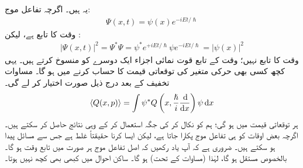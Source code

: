  \quad 
یہ  ہیں۔ اگرچہ تفاعل موج:
\begin{align}\label{مساوات_شروڈنگر_غیر_تابع_اور_تابع}
\Psi (x,t) = \psi (x) e^{-iEt/\hslash}
\end{align}
وقت  کا تابع ہے،  لیکن :
\begin{align}
\left| \Psi (x,t) \right|^{2} = \Psi^{*}\Psi = \psi^{*}e^{+iEt/\hslash} \psi e^{-iEt/\hslash} = \left| \psi (x) \right|^{2}
\end{align}
وقت کا تابع نہیں؛ وقت کے تابع قوت  نمائی اجزاء ایک دوسرے کو منسوخ کرتے ہیں۔ یہی کچھ کسی بھی حرکی متغیر کی توقعاتی قیمت کا  حساب کرنے میں ہو گا۔ مساوات  تخفیف کے بعد درج ذیل صورت اختیار کر لے گی۔ 
\begin{align}\label{مساوات_غیر_تابع_وقت_توقعاتی_قیمت}
\langle Q(x,p) \rangle = \int \psi^{*} Q \left( x, \frac{\hslash}{i} \frac{\dif}{\dif x} \right) \psi \dif x
\end{align}
ہر توقعاتی قیمت  میں  ہو گی؛ ہم  کو نکال کر  کی جگہ  استعمال کر کے وہی نتائج حاصل کر سکتے ہیں۔ اگرچہ بعض اوقات  کو ہی تفاعل موج پکارا جاتا ہے، لیکن ایسا کرنا حقیقتاً غلط ہے  جس سے مسائل پیدا ہو سکتے ہیں۔ ضروری ہے کہ آپ یاد رکھیں کہ اصل تفاعل موج ہر صورت میں تابع وقت ہو گا۔ بالخصوص  مستقل ہو گا، لہٰذا (مساوات  کے تحت)  ہو گا۔ ساکن  احوال  میں کبھی بھی کچھ نہیں ہوتا۔ 

